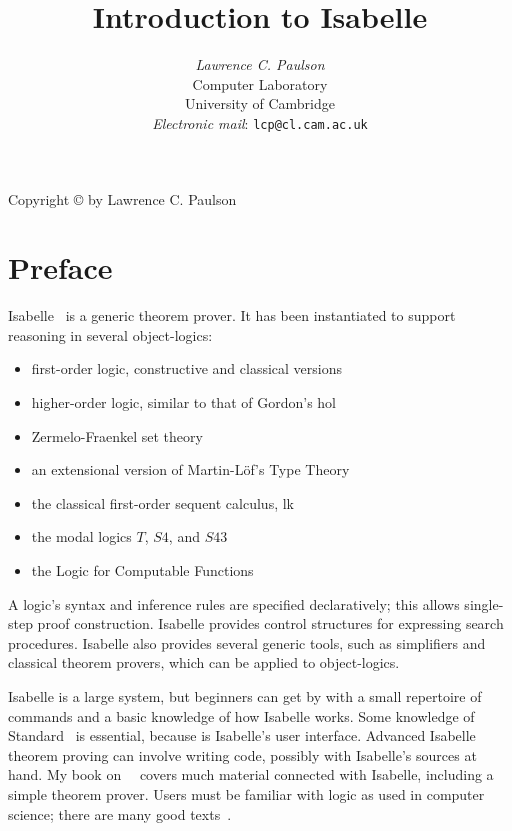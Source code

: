 \documentclass[12pt]{article}
\title{Introduction to Isabelle}
\author{{\em Lawrence C. Paulson}\\
        Computer Laboratory \\ University of Cambridge \\[2ex]
        {\small{\em Electronic mail\/}: {\tt lcp@cl.cam.ac.uk}}
}
\begin{document}
\pagestyle{empty}
\begin{titlepage}
\maketitle 
\thispagestyle{empty}
\vfill
{\small Copyright \copyright{} \number\year{} by Lawrence C. Paulson}
\end{titlepage}

\pagestyle{headings}
\part*{Preface}
 
Isabelle~\cite{paulson-natural,paulson-found,paulson700} is a generic theorem
prover.  It has been instantiated to support reasoning in several
object-logics:
\begin{itemize}
\item first-order logic, constructive and classical versions
\item higher-order logic, similar to that of Gordon's {\sc
hol}~\cite{mgordon-hol}
\item Zermelo-Fraenkel set theory~\cite{suppes72}
\item an extensional version of Martin-L\"of's Type Theory~\cite{nordstrom90}
\item the classical first-order sequent calculus, {\sc lk}
\item the modal logics $T$, $S4$, and $S43$
\item the Logic for Computable Functions~\cite{paulson87}
\end{itemize}
A logic's syntax and inference rules are specified declaratively; this
allows single-step proof construction.  Isabelle provides control
structures for expressing search procedures.  Isabelle also provides
several generic tools, such as simplifiers and classical theorem provers,
which can be applied to object-logics.

Isabelle is a large system, but beginners can get by with a small
repertoire of commands and a basic knowledge of how Isabelle works.  Some
knowledge of Standard~\ML{} is essential, because \ML{} is Isabelle's user
interface.  Advanced Isabelle theorem proving can involve writing \ML{}
code, possibly with Isabelle's sources at hand.  My book
on~\ML{}~\cite{paulson91} covers much material connected with Isabelle,
including a simple theorem prover.  Users must be familiar with logic as
used in computer science; there are many good
texts~\cite{galton90,reeves90}.
\end{document}
